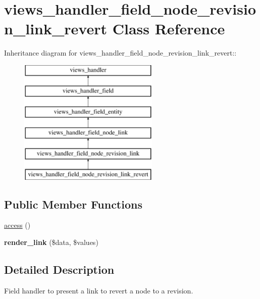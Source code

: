 \hypertarget{classviews__handler__field__node__revision__link__revert}{
\section{views\_\-handler\_\-field\_\-node\_\-revision\_\-link\_\-revert Class Reference}
\label{classviews__handler__field__node__revision__link__revert}
}
Inheritance diagram for views\_\-handler\_\-field\_\-node\_\-revision\_\-link\_\-revert::\begin{figure}[H]
\begin{center}
\leavevmode
\includegraphics[height=6cm]{classviews__handler__field__node__revision__link__revert}
\end{center}
\end{figure}
\subsection*{Public Member Functions}
\begin{DoxyCompactItemize}
\item 
\hyperlink{classviews__handler__field__node__revision__link__revert_a6cb6e683478e55b9e3e64602dbc8886d}{access} ()
\item 
\hypertarget{classviews__handler__field__node__revision__link__revert_a6dfdb203fea84ec02716d5abee757e7e}{
{\bfseries render\_\-link} (\$data, \$values)}
\label{classviews__handler__field__node__revision__link__revert_a6dfdb203fea84ec02716d5abee757e7e}

\end{DoxyCompactItemize}


\subsection{Detailed Description}
Field handler to present a link to revert a node to a revision. 

